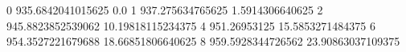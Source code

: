 0 935.6842041015625 0.0
1 937.275634765625 1.5914306640625
2 945.8823852539062 10.19818115234375
4 951.26953125 15.5853271484375
6 954.3527221679688 18.66851806640625
8 959.5928344726562 23.90863037109375
